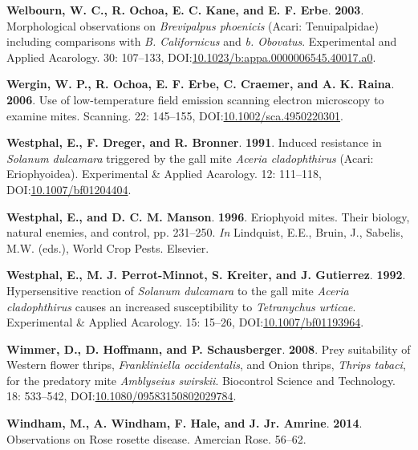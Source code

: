\documentclass[12pt,final,CPage]{ufthesis}
\newlength{\cslhangindent}
\newenvironment{CSLReferences}[2] %
{%
	\setlength{\parindent}{0pt}
	\ifodd #1 \everypar{\setlength{\hangindent}{\cslhangindent}}\ignorespaces\fi
	\ifnum #2 > 0
	\setlength{\parskip}{#2\baselineskip}
	\fi
}%
{}
\begin{document}
{\begin{CSLReferences}{1}{0}
  \leavevmode{}%
  \textbf{Welbourn, W. C., R. Ochoa, E. C. Kane, and E. F. Erbe}. \textbf{2003}. Morphological observations on {\emph{Brevipalpus phoenicis}} ({Acari}: {Tenuipalpidae}) including comparisons with {\emph{B. Californicus}} and {\emph{b. Obovatus}}. Experimental and Applied Acarology. 30: 107--133, DOI:\href{https://doi.org/10.1023/b:appa.0000006545.40017.a0}{10.1023/b:appa.0000006545.40017.a0}.

  \leavevmode{}%
  \textbf{Wergin, W. P., R. Ochoa, E. F. Erbe, C. Craemer, and A. K. Raina}. \textbf{2006}. Use of low-temperature field emission scanning electron microscopy to examine mites. Scanning. 22: 145--155, DOI:\href{https://doi.org/10.1002/sca.4950220301}{10.1002/sca.4950220301}.

  \leavevmode{}%
  \textbf{Westphal, E., F. Dreger, and R. Bronner}. \textbf{1991}. Induced resistance in {\emph{Solanum dulcamara}} triggered by the gall mite {\emph{Aceria cladophthirus}} ({Acari}: {Eriophyoidea}). Experimental {\&} Applied Acarology. 12: 111--118, DOI:\href{https://doi.org/10.1007/bf01204404}{10.1007/bf01204404}.

  \leavevmode{}%
  \textbf{Westphal, E., and D. C. M. Manson}. \textbf{1996}. Eriophyoid mites. Their biology, natural enemies, and control, pp. 231--250. \emph{In} Lindquist, E.E., Bruin, J., Sabelis, M.W. (eds.), World Crop Pests. Elsevier.

  \leavevmode{}%
  \textbf{Westphal, E., M. J. Perrot-Minnot, S. Kreiter, and J. Gutierrez}. \textbf{1992}. Hypersensitive reaction of {\emph{Solanum dulcamara}} to the gall mite {\emph{Aceria cladophthirus}} causes an increased susceptibility to {\emph{Tetranychus urticae}}. Experimental {\&} Applied Acarology. 15: 15--26, DOI:\href{https://doi.org/10.1007/bf01193964}{10.1007/bf01193964}.

  \leavevmode{}%
  \textbf{Wimmer, D., D. Hoffmann, and P. Schausberger}. \textbf{2008}. Prey suitability of {Western flower thrips}, {\emph{Frankliniella occidentalis}}, and {Onion thrips}, {\emph{Thrips tabaci}}, for the predatory mite {\emph{Amblyseius swirskii}}. Biocontrol Science and Technology. 18: 533--542, DOI:\href{https://doi.org/10.1080/09583150802029784}{10.1080/09583150802029784}.

  \leavevmode{}%
  \textbf{Windham, M., A. Windham, F. Hale, and J. Jr. Amrine}. \textbf{2014}. Observations on {Rose rosette disease}. Amercian Rose. 56--62.


\end{CSLReferences}}
\end{document}
